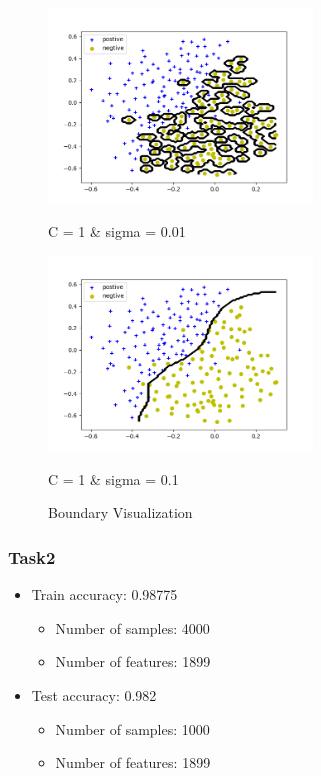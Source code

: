 \documentclass[UTF-8, a4paper, 10pt]{article}
\numberwithin{equation}{section}
\begin{document}
\begin{figure}[!htbp]
  \centering
  \begin{minipage}[t]{7.5cm}
    \includegraphics[width=7cm]{figure1.png}
    \centerline{C = 1 \& sigma = 0.01}
  \end{minipage}
  \begin{minipage}[t]{7.5cm}
    \includegraphics[width=7cm]{figure2.png}
    \centerline{C = 1 \& sigma = 0.1}
  \end{minipage}
  \caption{Boundary Visualization}\label{svm}
\end{figure}
\subsubsection{Task2}
\begin{itemize}
  \item Train accuracy: 0.98775
    \begin{itemize}
      \item Number of samples: 4000
      \item Number of features: 1899
    \end{itemize}
  \item Test accuracy: 0.982
    \begin{itemize}
      \item Number of samples: 1000
      \item Number of features: 1899
    \end{itemize}
\end{itemize}
\end{document}
